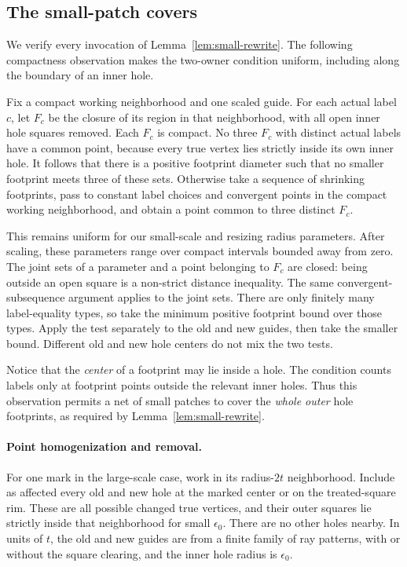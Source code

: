 \documentclass[11pt]{article}
\numberwithin{equation}{section}
\theoremstyle{definition}
\theoremstyle{remark}
\begin{document}
\subsection{The small-patch covers}

We verify every invocation of Lemma~\ref{lem:small-rewrite}.  The
following compactness observation makes the two-owner condition
uniform, including along the boundary of an inner hole.

Fix a compact working neighborhood and one scaled guide.  For each
actual label $c$, let $F_c$ be the closure of its region in that
neighborhood, with all open inner hole squares removed.  Each $F_c$
is compact.  No three $F_c$ with distinct actual labels have a common
point, because every true vertex lies strictly inside its own inner
hole.  It follows that there is a positive footprint diameter such
that no smaller footprint meets three of these sets.  Otherwise take
a sequence of shrinking footprints, pass to constant label choices
and convergent points in the compact working neighborhood, and obtain
a point common to three distinct $F_c$.

This remains uniform for our small-scale and resizing radius
parameters.  After scaling, these parameters range over compact
intervals bounded away from zero.  The joint sets of a parameter and
a point belonging to $F_c$ are closed: being outside an open square
is a non-strict distance inequality.  The same convergent-subsequence
argument applies to the joint sets.  There are only finitely many
label-equality types, so take the minimum positive footprint bound
over those types.  Apply the test separately to the old and new
guides, then take the smaller bound.  Different old and new hole
centers do not mix the two tests.

Notice that the \emph{center} of a footprint may lie inside a hole.
The condition counts labels only at footprint points outside the
relevant inner holes.  Thus this observation permits a net of small
patches to cover the \emph{whole outer} hole footprints, as required
by Lemma~\ref{lem:small-rewrite}.

\paragraph{Point homogenization and removal.}
For one mark in the large-scale case, work in its radius-$2t$
neighborhood.  Include as affected every old and new hole at the
marked center or on the treated-square rim.  These are all possible
changed true vertices, and their outer squares lie strictly inside
that neighborhood for small $\epsilon_0$.  There are no other holes
nearby.  In units of $t$, the old and new guides are from a finite
family of ray patterns, with or without the square clearing, and the
inner hole radius is $\epsilon_0$.
\end{document}
